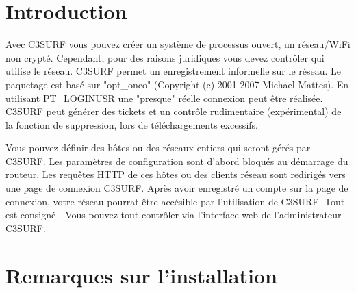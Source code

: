 \section {Introduction}

Avec C3SURF vous pouvez créer un système de processus ouvert, un réseau/WiFi non crypté.
Cependant, pour des raisons juridiques vous devez contrôler qui utilise le réseau.
C3SURF permet un enregistrement informelle sur le réseau. Le paquetage est basé sur
"opt\_onco" (Copyright (c) 2001-2007 Michael Mattes). En utilisant PT\_LOGINUSR une
"presque" réelle connexion peut être réalisée. C3SURF peut générer des tickets et
un contrôle rudimentaire (expérimental) de la fonction de suppression, lors de
téléchargements excessifs.


Vous pouvez définir des hôtes ou des réseaux entiers qui seront gérés par C3SURF.
Les paramètres de configuration sont d'abord bloqués au démarrage du routeur.
Les requêtes HTTP de ces hôtes ou des clients réseau sont redirigés vers une
page de connexion C3SURF. Après avoir enregistré un compte sur la page de
connexion, votre réseau pourrat être accésible par l'utilisation de C3SURF. Tout
est consigné - Vous pouvez tout contrôler via l'interface web de l'administrateur
C3SURF.

\section {Remarques sur l'installation}

